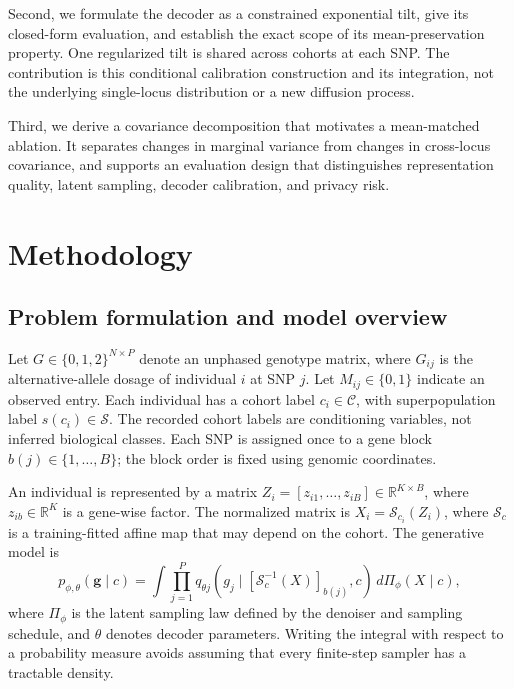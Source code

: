 \documentclass[11pt,a4paper]{article}
\begin{document}
Second, we formulate the decoder as a constrained exponential tilt, give its
closed-form evaluation, and establish the exact scope of its mean-preservation
property. One regularized tilt is shared across cohorts at each SNP. The
contribution is this conditional calibration construction and its integration,
not the underlying single-locus distribution or a new diffusion process.

Third, we derive a covariance decomposition that motivates a mean-matched
ablation. It separates changes in marginal variance from changes in
cross-locus covariance, and supports an evaluation design that distinguishes
representation quality, latent sampling, decoder calibration, and privacy
risk.

\section{Methodology}
\label{sec:method}

\subsection{Problem formulation and model overview}
\label{sec:problem}

Let $G\in\{0,1,2\}^{N\times P}$ denote an unphased genotype matrix, where
$G_{ij}$ is the alternative-allele dosage of individual $i$ at SNP $j$.
Let $M_{ij}\in\{0,1\}$ indicate an observed entry. Each individual has a cohort
label $c_i\in\mathcal C$, with superpopulation label $s(c_i)\in\mathcal S$.
The recorded cohort labels are conditioning variables, not inferred biological
classes. Each SNP is assigned once to a gene block $b(j)\in\{1,\ldots,B\}$;
the block order is fixed using genomic coordinates.

An individual is represented by a matrix
$Z_i=[z_{i1},\ldots,z_{iB}]\in\mathbb R^{K\times B}$, where
$z_{ib}\in\mathbb R^K$ is a gene-wise factor. The normalized matrix is
$X_i=\mathcal S_{c_i}(Z_i)$, where $\mathcal S_c$ is a training-fitted affine
map that may depend on the cohort. The generative model is
\begin{equation}
 p_{\phi,\theta}(\mathbf g\mid c)
 =\int \prod_{j=1}^{P}
 q_{\theta j}\!\left(g_j\mid
          [\mathcal S_c^{-1}(X)]_{b(j)},c\right)
 \,d\Pi_\phi(X\mid c),
 \label{eq:model}
\end{equation}
where $\Pi_\phi$ is the latent sampling law defined by the denoiser and sampling
schedule, and $\theta$ denotes decoder parameters. Writing the integral with
respect to a probability measure avoids assuming that every finite-step
sampler has a tractable density.
\end{document}
